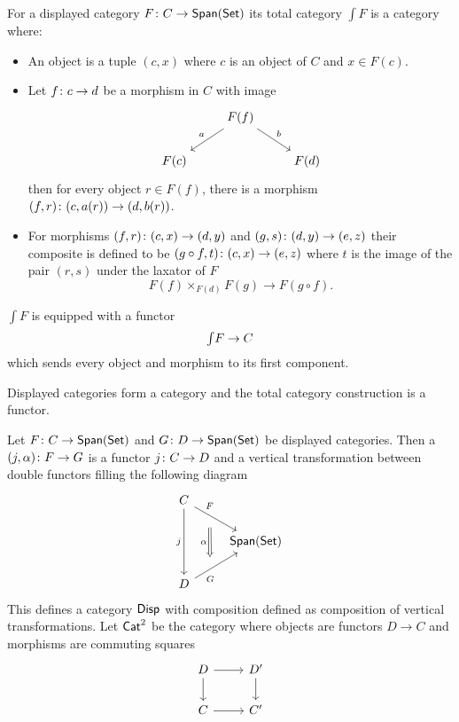 \begin{defn}\label{totalcat}
For a displayed category $F \colon C \to \mathsf{Span}(\mathsf{Set})$ its total category $\int F$ is a category where:
\begin{itemize}
    \item An object is a tuple $(c,x)$ where $c$ is an object of $C$ and $x \in F(c)$.
    \item Let $f \colon c \to d$ be a morphism in $C$ with image
    \[\begin{tikzcd}
     & F(f)\ar[dr,"b"] \ar[dl,"a",swap]& \\
    F(c) & & F(d) \end{tikzcd} \]
    then for every object $r \in F(f)$, there is a morphism $(f,r) \colon (c,a(r)) \to (d,b(r))$.
    \item For morphisms $(f,r) \colon (c,x) \to (d,y)$ and $(g,s) \colon (d,y) \to (e,z)$ their composite is defined to be $(g \circ f, t) \colon (c,x) \to (e,z)$ where $t$ is the image of the pair $(r,s)$ under the laxator of $F$
    \[F(f) \times_{F(d)} F(g) \to F(g \circ f). \]
    \end{itemize}
    $\int F$ is equipped with a functor 
    \[\textstyle{\int} F \to C \]
    which sends every object and morphism to its first component.
\end{defn}
Displayed categories form a category and the total category construction is a functor.
\begin{defn}
Let $F \colon C \to \mathsf{Span}(\mathsf{Set})$ and $G \colon D \to \mathsf{Span}(\mathsf{Set})$ be displayed categories. Then a  $(j,\alpha) \colon F \to G$ is a functor $j \colon C \to D$  and a vertical transformation between double functors filling the following diagram
\[
    \begin{tikzcd}
        C
        \ar[dd,"{j}",swap] 
        \ar[dr,"F"{name=U},pos=0.2]
        &\\&  
        \Span(\Set)
        \\
    D
        \ar[ur,"G"{name=D}, swap, pos=0.2]
        & 
        \arrow[Rightarrow, from = U, to = D, shorten <=3ex, shorten >=3ex, "\alpha", swap]
    \end{tikzcd}
    \]
 This defines a category ${\bf \boldmath{\mathsf{Disp}}}$ with composition defined as composition of vertical transformations. Let $\mathsf{Cat}^2$ be the category where objects are functors $D \to C$ and morphisms are commuting squares
\[\begin{tikzcd}
D \ar[d] \ar[r] & D' \ar[d]\\
C \ar[r] & C'
\end{tikzcd}
\]


\end{defn}
